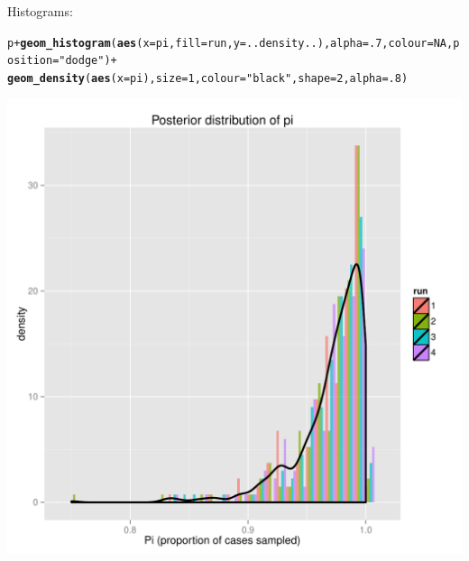 \documentclass{article}\usepackage[]{graphicx}\usepackage[]{color}
\makeatletter
\newcommand{\hlnum}[1]{\textcolor[rgb]{0.686,0.059,0.569}{#1}}%
\newcommand{\hlstr}[1]{\textcolor[rgb]{0.192,0.494,0.8}{#1}}%
\newcommand{\hlopt}[1]{\textcolor[rgb]{0,0,0}{#1}}%
\newcommand{\hlstd}[1]{\textcolor[rgb]{0.345,0.345,0.345}{#1}}%
\newcommand{\hlkwc}[1]{\textcolor[rgb]{0.333,0.667,0.333}{#1}}%
\newcommand{\hlkwd}[1]{\textcolor[rgb]{0.737,0.353,0.396}{\textbf{#1}}}%
\newenvironment{kframe}{%
 \def\at@end@of@kframe{}%
 \ifinner\ifhmode%
  \def\at@end@of@kframe{\end{minipage}}%
  \begin{minipage}{\columnwidth}%
 \fi\fi%
 \def\FrameCommand##1{\hskip\@totalleftmargin \hskip-\fboxsep
 \colorbox{shadecolor}{##1}\hskip-\fboxsep
     \hskip-\linewidth \hskip-\@totalleftmargin \hskip\columnwidth}%
 \MakeFramed {\advance\hsize-\width
   \@totalleftmargin\z@ \linewidth\hsize
   \@setminipage}}%
 {\par\unskip\endMakeFramed%
 \at@end@of@kframe}
\newenvironment{knitrout}{}{} %
\makeatother
\begin{document}
Histograms:
\begin{knitrout}
\color{fgcolor}\begin{kframe}
\begin{alltt}
\hlstd{p} \hlopt{+} \hlkwd{geom_histogram}\hlstd{(}\hlkwd{aes}\hlstd{(}\hlkwc{x}\hlstd{=pi,} \hlkwc{fill}\hlstd{=run,} \hlkwc{y}\hlstd{=..density..),} \hlkwc{alpha}\hlstd{=}\hlnum{.7}\hlstd{,} \hlkwc{colour}\hlstd{=}\hlnum{NA}\hlstd{,} \hlkwc{position}\hlstd{=}\hlstr{"dodge"}\hlstd{)} \hlopt{+}
    \hlkwd{geom_density}\hlstd{(}\hlkwd{aes}\hlstd{(}\hlkwc{x}\hlstd{=pi),} \hlkwc{size}\hlstd{=}\hlnum{1}\hlstd{,} \hlkwc{colour}\hlstd{=}\hlstr{"black"}\hlstd{,} \hlkwc{shape}\hlstd{=}\hlnum{2}\hlstd{,} \hlkwc{alpha}\hlstd{=}\hlnum{.8}\hlstd{)}
\end{alltt}


{\ttfamily\noindent\itshape\color{messagecolor}{\#\# stat\_bin: binwidth defaulted to range/30. Use 'binwidth = x' to adjust this.}}\end{kframe}

{\centering \includegraphics[width=.6\textwidth]{figs/unnamed-chunk-39} 

}



\end{knitrout}
\end{document}

